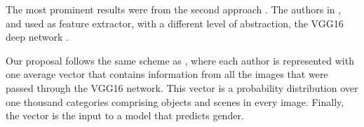 \documentclass[runningheads]{llncs}
\begin{document}
The most prominent results were from the second approach \cite{rangel_rosso_montes-y-gomez_potthast_stein}. The authors in 
\cite{aragon2018straightforward}, 
\cite{takahashi_tahara_nagatan_miura_taniguchi_ohkuma} and \cite{sierra_gonzales}
used as feature extractor, with a different level of abstraction, the
VGG16 deep network \cite{zisserman_simonyan_2015}.

Our proposal follows the same scheme as \cite{aragon2018straightforward}, 
where each author is represented with one average vector that contains
information from all the images that were passed through the VGG16 network.
This vector is a probability distribution over one thousand categories
comprising objects and scenes in every image. Finally, the vector is the input to a model that predicts gender.


\end{document}
